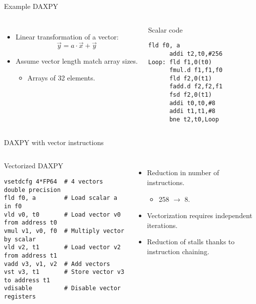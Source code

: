 \begin{frame}[t,fragile]{Example DAXPY}
\begin{columns}[T]

\begin{itemize}
  \item Linear transformation of a vector:
\[
\vec{y} = a \cdot \vec{x} + \vec{y}
\]

  \item Assume vector length match array sizes.
    \begin{itemize}
      \item Arrays of 32 elements.
    \end{itemize}
\end{itemize}

\pause
{}
\begin{block}{Scalar code}
\begin{lstlisting}[language=generalasm2]
      fld f0, a
      addi t2,t0,#256
Loop: fld f1,0(t0)
      fmul.d f1,f1,f0
      fld f2,0(t1)
      fadd.d f2,f2,f1
      fsd f2,0(t1)
      addi t0,t0,#8
      addi t1,t1,#8
      bne t2,t0,Loop
\end{lstlisting}
\end{block}

\end{columns}
\end{frame}

\begin{frame}[t,fragile]{DAXPY with vector instructions}
\begin{columns}[T]

\begin{block}{Vectorized DAXPY}
\begin{lstlisting}[language=generalasm2]
vsetdcfg 4*FP64  # 4 vectors double precision
fld f0, a        # Load scalar a in f0
vld v0, t0       # Load vector v0 from address t0
vmul v1, v0, f0  # Multiply vector by scalar
vld v2, t1       # Load vector v2 from address t1
vadd v3, v1, v2  # Add vectors
vst v3, t1       # Store vector v3 to address t1
vdisable         # Disable vector registers
\end{lstlisting}
\end{block}

\begin{itemize}
  \item Reduction in number of instructions.
    \begin{itemize}
      \item 258 $\rightarrow$ 8.
    \end{itemize}

  \item Vectorization requires independent iterations.

  \item Reduction of stalls thanks to instruction chaining.
\end{itemize}

\end{columns}
\end{frame}
